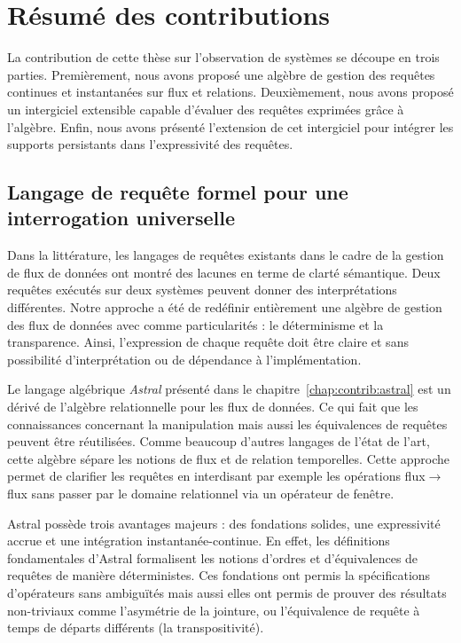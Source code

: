 \section{Résumé des contributions}\label{sec:conclusion:contributions}
La contribution de cette thèse sur l'observation de systèmes se découpe en trois parties. Premièrement, nous avons proposé une algèbre de gestion des requêtes continues et instantanées sur flux et relations. Deuxièmement, nous avons proposé un intergiciel extensible capable d'évaluer des requêtes exprimées grâce à l'algèbre. Enfin, nous avons présenté l'extension de cet intergiciel pour intégrer les supports persistants dans l'expressivité des requêtes.

\subsection{Langage de requête formel pour une interrogation universelle}
Dans la littérature, les langages de requêtes existants dans le cadre de la gestion de flux de données ont montré des lacunes en terme de clarté sémantique. Deux requêtes exécutés sur deux systèmes peuvent donner des interprétations différentes. Notre approche a été de redéfinir entièrement une algèbre de gestion des flux de données avec comme particularités : le déterminisme et la transparence. Ainsi, l'expression de chaque requête doit être claire et sans possibilité d'interprétation ou de dépendance à l'implémentation.

Le langage algébrique \textit{Astral} présenté dans le chapitre~\ref{chap:contrib:astral} est un dérivé de l'algèbre relationnelle pour les flux de données. Ce qui fait que les connaissances concernant la manipulation mais aussi les équivalences de requêtes peuvent être réutilisées. Comme beaucoup d'autres langages de l'état de l'art, cette algèbre sépare les notions de flux et de relation temporelles. Cette approche permet de clarifier les requêtes en interdisant par exemple les opérations flux$\to$flux sans passer par le domaine relationnel via un opérateur de fenêtre.

Astral possède trois avantages majeurs : des fondations solides, une expressivité accrue et une intégration instantanée-continue. En effet, les définitions fondamentales d'Astral formalisent les notions d'ordres et d'équivalences de requêtes de manière déterministes. Ces fondations ont permis la spécifications d'opérateurs sans ambiguïtés mais aussi elles ont permis de prouver des résultats non-triviaux comme l'asymétrie de la jointure, ou l'équivalence de requête à temps de départs différents (la transpositivité).

